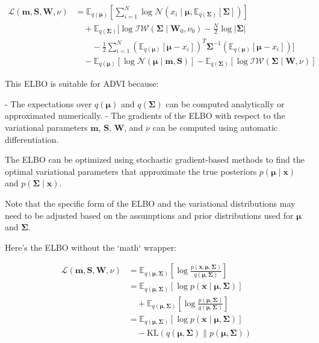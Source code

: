 \documentclass[11pt]{article}
\begin{document}
    \begin{align*}
        \mathcal{L}(\boldsymbol{m}, \boldsymbol{S}, \boldsymbol{W}, \nu) &= \mathbb{E}_{q(\boldsymbol{\mu})} \left[ \sum_{i=1}^N \log \mathcal{N}(x_i \mid \boldsymbol{\mu}, \mathbb{E}_{q(\boldsymbol{\Sigma})}[\boldsymbol{\Sigma}]) \right] \\
        &\quad + \mathbb{E}_{q(\boldsymbol{\Sigma})} \bigg[ \log \mathcal{IW}(\boldsymbol{\Sigma} \mid \boldsymbol{W}_0, \nu_0) - \frac{N}{2} \log |\boldsymbol{\Sigma}| \\
        &\qquad - \frac{1}{2} \sum_{i=1}^N (\mathbb{E}_{q(\boldsymbol{\mu})}[\boldsymbol{\mu} - x_i])^T \boldsymbol{\Sigma}^{-1} (\mathbb{E}_{q(\boldsymbol{\mu})}[\boldsymbol{\mu} - x_i]) \bigg] \\
        &\quad - \mathbb{E}_{q(\boldsymbol{\mu})} \left[ \log \mathcal{N}(\boldsymbol{\mu} \mid \boldsymbol{m}, \boldsymbol{S}) \right] - \mathbb{E}_{q(\boldsymbol{\Sigma})} \left[ \log \mathcal{IW}(\boldsymbol{\Sigma} \mid \boldsymbol{W}, \nu) \right]
    \end{align*}

    This ELBO is suitable for ADVI because:

    - The expectations over $q(\boldsymbol{\mu})$ and $q(\boldsymbol{\Sigma})$ can be computed analytically or approximated numerically.
    - The gradients of the ELBO with respect to the variational parameters $\boldsymbol{m}$, $\boldsymbol{S}$, $\boldsymbol{W}$, and $\nu$ can be computed using automatic differentiation.

    The ELBO can be optimized using stochastic gradient-based methods to find the optimal variational parameters that approximate the true posteriors $p(\boldsymbol{\mu} \mid \mathbf{x})$ and $p(\boldsymbol{\Sigma} \mid \mathbf{x})$.

    Note that the specific form of the ELBO and the variational distributions may need to be adjusted based on the assumptions and prior distributions used for $\boldsymbol{\mu}$ and $\boldsymbol{\Sigma}$.

    Here's the ELBO without the `math` wrapper:

    \begin{align*}
        \mathcal{L}(\boldsymbol{m}, \boldsymbol{S}, \boldsymbol{W}, \nu) &= \mathbb{E}_{q(\boldsymbol{\mu}, \boldsymbol{\Sigma})} \left[ \log \frac{p(\mathbf{x}, \boldsymbol{\mu}, \boldsymbol{\Sigma})}{q(\boldsymbol{\mu}, \boldsymbol{\Sigma})} \right] \\
        &= \mathbb{E}_{q(\boldsymbol{\mu}, \boldsymbol{\Sigma})} \left[ \log p(\mathbf{x} \mid \boldsymbol{\mu}, \boldsymbol{\Sigma}) \right] \\
        &\quad + \mathbb{E}_{q(\boldsymbol{\mu}, \boldsymbol{\Sigma})} \left[ \log \frac{p(\boldsymbol{\mu}, \boldsymbol{\Sigma})}{q(\boldsymbol{\mu}, \boldsymbol{\Sigma})} \right] \\
        &= \mathbb{E}_{q(\boldsymbol{\mu}, \boldsymbol{\Sigma})} \left[ \log p(\mathbf{x} \mid \boldsymbol{\mu}, \boldsymbol{\Sigma}) \right] \\
        &\quad - \text{KL}(q(\boldsymbol{\mu}, \boldsymbol{\Sigma}) \| p(\boldsymbol{\mu}, \boldsymbol{\Sigma}))
    \end{align*}
\end{document}
